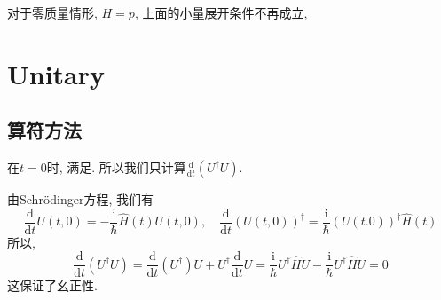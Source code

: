 \documentclass{ctexart}
\begin{document}
对于零质量情形, $H =p$, 上面的小量展开条件不再成立, 


\section{Unitary}
\subsection{算符方法}在$t=0$时, 满足. 所以我们只计算$\frac{\mathrm{d}}{\mathrm{d} t} \left( U^{\dagger} U \right) $. 

由Schr\"odinger方程, 我们有
\begin{equation}
  \frac{\mathrm{d}}{\mathrm{d} t} U(t,0) = -\frac{\mathrm{i} }{\hbar}\hat{H}(t)U(t,0),
  \quad
  \frac{\mathrm{d}}{\mathrm{d} t}\left( U(t,0) \right) ^{\dagger} = \frac{\mathrm{i} }{\hbar}\left( U(t.0) \right) ^{\dagger}\hat{H}(t)
\end{equation}
所以,
\begin{equation}
  \frac{\mathrm{d}}{\mathrm{d} t}\left( U^{\dagger} U \right)  = \frac{\mathrm{d}}{\mathrm{d} t} (U^{\dagger} )U + U^{\dagger} \frac{\mathrm{d}}{\mathrm{d} t}U
  = \frac{\mathrm{i} }{\hbar} U^{\dagger}\hat{H} U - \frac{\mathrm{i} }{\hbar} U^{\dagger} \hat{H} U =0
\end{equation}
这保证了幺正性.
\end{document}
